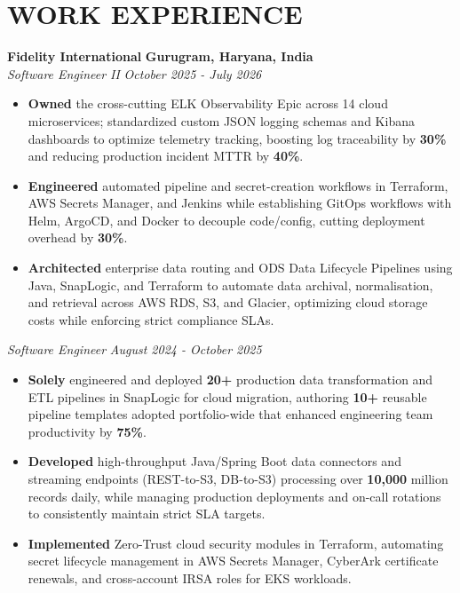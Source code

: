 \documentclass[10pt,a4paper]{article}
\begin{document}
\section*{WORK EXPERIENCE}
\noindent \textbf{Fidelity International} \hfill \textbf{Gurugram, Haryana, India} \\
\textit{Software Engineer II} \hfill \textit{October 2025 - July 2026}
\begin{itemize}
\item \textbf{Owned} the cross-cutting ELK Observability Epic across 14 cloud microservices; standardized custom JSON logging schemas and Kibana dashboards to optimize telemetry tracking, boosting log traceability by \textbf{30\%} and reducing production incident MTTR by \textbf{40\%}.
\item \textbf{Engineered} automated pipeline and secret-creation workflows in Terraform, AWS Secrets Manager, and Jenkins while establishing GitOps workflows with Helm, ArgoCD, and Docker to decouple code/config, cutting deployment overhead by \textbf{30\%}.
\item \textbf{Architected} enterprise data routing and ODS Data Lifecycle Pipelines using Java, SnapLogic, and Terraform to automate data archival, normalisation, and retrieval across AWS RDS, S3, and Glacier, optimizing cloud storage costs while enforcing strict compliance SLAs.
\end{itemize}
\vspace{1pt}
\textit{Software Engineer} \hfill \textit{August 2024 - October 2025}
\begin{itemize}
\item \textbf{Solely} engineered and deployed \textbf{20+} production data transformation and ETL pipelines in SnapLogic for cloud migration, authoring \textbf{10+} reusable pipeline templates adopted portfolio-wide that enhanced engineering team productivity by \textbf{75\%}.
\item \textbf{Developed} high-throughput Java/Spring Boot data connectors and streaming endpoints (REST-to-S3, DB-to-S3) processing over \textbf{10,000} million records daily, while managing production deployments and on-call rotations to consistently maintain strict SLA targets.
\item \textbf{Implemented} Zero-Trust cloud security modules in Terraform, automating secret lifecycle management in AWS Secrets Manager, CyberArk certificate renewals, and cross-account IRSA roles for EKS workloads.
\end{itemize}
\vspace{1pt}
\end{document}
